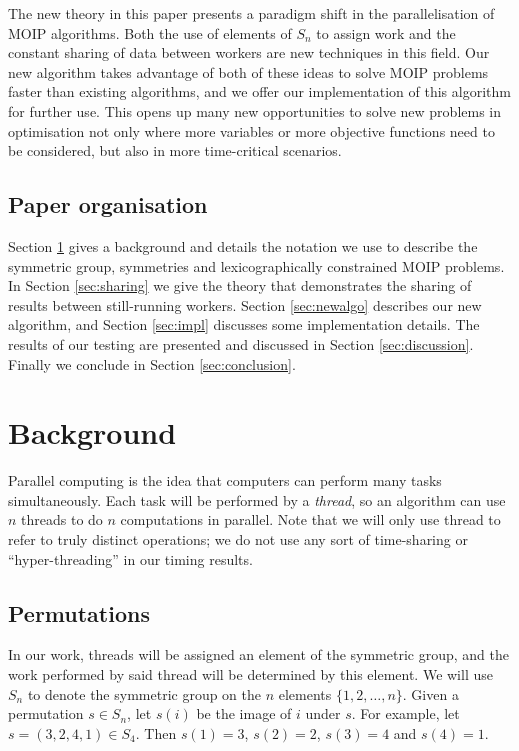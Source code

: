 \documentclass{amsart}
\theoremstyle{definition}
\begin{document}
The new theory in this paper presents a paradigm shift in the parallelisation of MOIP algorithms.
Both the use of elements of $S_n$ to assign work and the constant sharing of data between workers are new techniques in this field.
Our new algorithm takes advantage of both of these ideas to solve MOIP problems faster than existing algorithms, and we offer our implementation of this algorithm for further use.
This opens up many new opportunities to solve new problems in optimisation not only where more variables or more objective functions need to be considered, but also in more time-critical scenarios.

\subsection{Paper organisation}
Section \ref{sec:background} gives a background and details the notation we use to describe the symmetric group, symmetries and lexicographically constrained MOIP problems.
In Section \ref{sec:sharing} we give the theory that demonstrates the sharing of results between still-running workers.
Section \ref{sec:newalgo} describes our new algorithm, and Section \ref{sec:impl} discusses some implementation details.
The results of our testing are presented and discussed in Section \ref{sec:discussion}.
Finally we conclude in Section \ref{sec:conclusion}.

\section{Background}\label{sec:background}

Parallel computing is the idea that computers can perform many tasks simultaneously.
Each task will be performed by a {\em thread}, so an algorithm can use $n$ threads to do $n$ computations in parallel.
Note that we will only use thread to refer to truly distinct operations; we do not use any sort of time-sharing or ``hyper-threading'' in our timing results.

\subsection{Permutations}

In our work, threads will be assigned an element of the symmetric group, and the work performed by said thread will be determined by this element.
We will use $S_n$ to denote the symmetric group on the $n$ elements $\{1,2,\ldots,n\}$.
Given a permutation $s \in S_n$, let $s(i)$ be the image of $i$ under $s$.
For example, let $s = (3,2,4,1) \in S_4$. Then $s(1) = 3$, $s(2) = 2$, $s(3) = 4$ and $s(4) = 1$.
\end{document}
